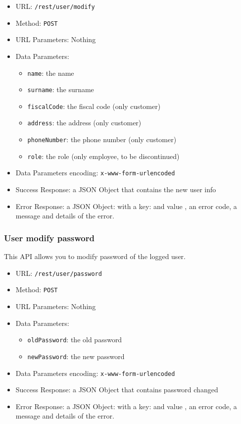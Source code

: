 \begin{itemize}
    \item URL: \texttt{/rest/user/modify}
    \item Method: \texttt{POST}
    \item URL Parameters: Nothing
    \item Data Parameters:
    \begin{itemize}
        \item \texttt{name}: the name
        \item \texttt{surname}: the surname
        \item \texttt{fiscalCode}: the fiscal code (only customer)
        \item \texttt{address}: the address (only customer)
        \item \texttt{phoneNumber}: the phone number (only customer)
        \item \texttt{role}: the role (only employee, to be discontinued)
    \end{itemize}
    \item Data Parameters encoding: \texttt{x-www-form-urlencoded}
    \item Success Response: a JSON Object that contains the new user info
    \item Error Response: a JSON Object: with a key:   and value , an error code, a message and details of the error.
\end{itemize}

\subsubsection*{User modify password}

This API allows you to modify password of the logged user.

\begin{itemize}
    \item URL: \texttt{/rest/user/password}
    \item Method: \texttt{POST}
    \item URL Parameters: Nothing
    \item Data Parameters:
    \begin{itemize}
        \item \texttt{oldPassword}: the old password
        \item \texttt{newPassword}: the new password
    \end{itemize}
    \item Data Parameters encoding: \texttt{x-www-form-urlencoded}
    \item Success Response: a JSON Object that contains password changed
    \item Error Response: a JSON Object: with a key:   and value , an error code, a message and details of the error.
\end{itemize}